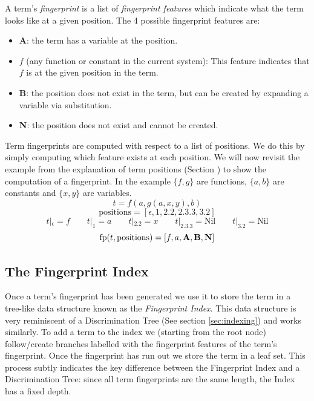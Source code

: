 A term's \emph{fingerprint} is a list of \emph{fingerprint features} which
indicate what the term looks like at a given position. The 4 possible
fingerprint features are:
\begin{itemize}
\item \textbf{A}: the term has a variable at the position.
\item $f$ (any function or constant in the current system): This
feature indicates that $f$ is at the given position in the term.
\item \textbf{B}: the position does not exist in the term, but can be created
by expanding a variable via substitution.
\item \textbf{N}: the position does not exist and cannot be created.
\end{itemize}
Term fingerprints are computed with respect to a list of positions. We do this by simply
computing which feature exists at each position. We will now revisit the example from
the explanation of term positions (Section \label{sec:terminology}) to show
the computation of a fingerprint. In the example $\{f,g\}$ are functions, $\{a,b\}$ are
constants and $\{x,y\}$ are variables.
\[t = f(a, g(a, x, y), b)\]
\[\text{positions} = [\epsilon, 1, 2.2, 2.3.3, 3.2] \]
\[t|_{\epsilon} = f \quad\quad t|_{1} = a \quad\quad  t|_{2.2} = x \quad\quad  t|_{2.3.3} = \text{Nil} \quad\quad  t|_{3.2} = \text{Nil}\]
\[\text{fp}(t, \text{positions}) = [f, a, \textbf{A}, \textbf{B}, \textbf{N}] \]

\subsection{The Fingerprint Index}
\label{sec:fpindex}

Once a term's fingerprint has been generated we use it to store the term in a tree-like
data structure known as the \emph{Fingerprint Index}. 
This data structure is very reminiscent of a Discrimination Tree (See section \ref{sec:indexing})
and works similarly. To add a term to the index we (starting from the root node) follow/create
branches labelled with the fingerprint features of the term's fingerprint. Once the fingerprint has run
out we store the term in a leaf set. This process subtly indicates the key difference
between the Fingerprint Index and a Discrimination Tree: since all term fingerprints
are the same length, the Index has a fixed depth.

